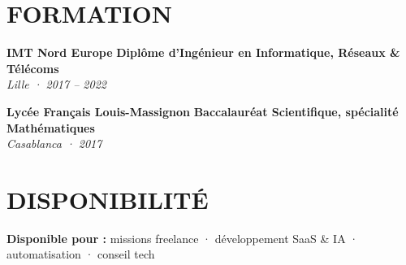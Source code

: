 \documentclass[a4paper,11pt]{article}
\begin{document}
\vspace{0.3cm}

\section*{FORMATION}

\noindent\textbf{IMT Nord Europe} \hfill \textbf{Diplôme d'Ingénieur en Informatique, Réseaux \& Télécoms} \\
\textit{Lille · 2017 – 2022}

\vspace{0.1cm}

\noindent\textbf{Lycée Français Louis-Massignon} \hfill \textbf{Baccalauréat Scientifique, spécialité Mathématiques} \\
\textit{Casablanca · 2017}

\vspace{0.3cm}

\section*{DISPONIBILITÉ}

\noindent\textbf{Disponible pour :} missions freelance · développement SaaS \& IA · automatisation · conseil tech
\end{document}
